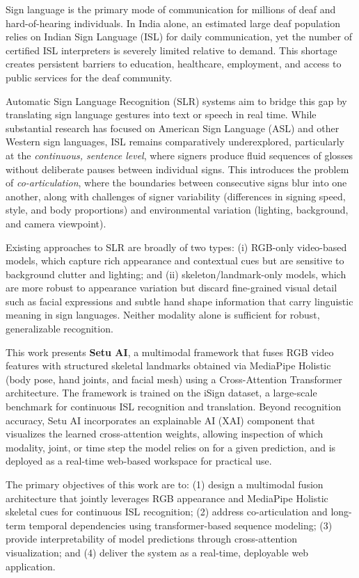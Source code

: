 \documentclass[pdflatex,sn-mathphys-num]{sn-jnl}
\begin{document}
Sign language is the primary mode of communication for millions of deaf and hard-of-hearing individuals. In India alone, an estimated large deaf population relies on Indian Sign Language (ISL) for daily communication, yet the number of certified ISL interpreters is severely limited relative to demand. This shortage creates persistent barriers to education, healthcare, employment, and access to public services for the deaf community.

Automatic Sign Language Recognition (SLR) systems aim to bridge this gap by translating sign language gestures into text or speech in real time. While substantial research has focused on American Sign Language (ASL) and other Western sign languages, ISL remains comparatively underexplored, particularly at the \emph{continuous, sentence level}, where signers produce fluid sequences of glosses without deliberate pauses between individual signs. This introduces the problem of \emph{co-articulation}, where the boundaries between consecutive signs blur into one another, along with challenges of signer variability (differences in signing speed, style, and body proportions) and environmental variation (lighting, background, and camera viewpoint).

Existing approaches to SLR are broadly of two types: (i) RGB-only video-based models, which capture rich appearance and contextual cues but are sensitive to background clutter and lighting; and (ii) skeleton/landmark-only models, which are more robust to appearance variation but discard fine-grained visual detail such as facial expressions and subtle hand shape information that carry linguistic meaning in sign languages. Neither modality alone is sufficient for robust, generalizable recognition.

This work presents \textbf{Setu AI}, a multimodal framework that fuses RGB video features with structured skeletal landmarks obtained via MediaPipe Holistic (body pose, hand joints, and facial mesh) using a Cross-Attention Transformer architecture. The framework is trained on the iSign dataset, a large-scale benchmark for continuous ISL recognition and translation. Beyond recognition accuracy, Setu AI incorporates an explainable AI (XAI) component that visualizes the learned cross-attention weights, allowing inspection of which modality, joint, or time step the model relies on for a given prediction, and is deployed as a real-time web-based workspace for practical use.

The primary objectives of this work are to: (1) design a multimodal fusion architecture that jointly leverages RGB appearance and MediaPipe Holistic skeletal cues for continuous ISL recognition; (2) address co-articulation and long-term temporal dependencies using transformer-based sequence modeling; (3) provide interpretability of model predictions through cross-attention visualization; and (4) deliver the system as a real-time, deployable web application.
\end{document}
